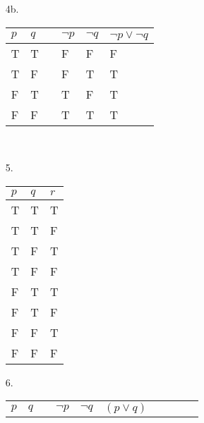 \begin{enumerate}
        \item[4b.]
            \begin{tabular}{ | p{1cm} | p{1cm} | c | p{2cm} | p{2cm} | p{3cm} | }
                \hline
                $p$ & $q$ & & $\neg p$ & $\neg q$ & $\neg p \lor \neg q$ \\ \hline
                T & T &
                &  F 
                &  F 
                &  F 
                \\ \hline
                T & F &
                &  F 
                &  T 
                &  T 
                \\ \hline
                F & T &
                &  T 
                &  F 
                &  T 
                \\ \hline
                F & F &
                &  T 
                &  T 
                &  T 
                \\ \hline
            \end{tabular} ~\\

    \item[5.]
        \begin{tabular}{ | p{2cm} | p{2cm} | p{2cm} | }
            \hline
            $p$ & $q$ & $r$
            \\ \hline
            T & T & T
            \\ \hline
            T & T & F
            \\ \hline
            T &  F  &  T 
            \\ \hline
            T & F & F
            \\ \hline
            F &  T  &  T 
            \\ \hline
            F &  T  &  F 
            \\ \hline
            F &  F  &  T 
            \\ \hline
            F & F & F
            \\ \hline
        \end{tabular}

    \item[6.]
        \begin{tabular}{ | c | c | c | c |  c | c | c | c | c | c | }
            \hline
                $p$ &
                $q$ & &

                $\neg p$ &
                $\neg q$ &

                $(p \lor q)$ & &


\end{tabular}
\end{enumerate}

